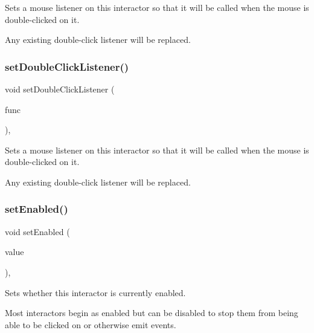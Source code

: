 Sets a mouse listener on this interactor so that it will be called when the mouse is double-\/clicked on it. 

Any existing double-\/click listener will be replaced. \mbox{\label{classGInteractor_a50096194d66f48c92dd4c512d41bfc76}} 
\subsubsection{\texorpdfstring{set\+Double\+Click\+Listener()}{setDoubleClickListener()}\hspace{0.1cm}{\footnotesize\ttfamily [2/2]}}
{\footnotesize\ttfamily void set\+Double\+Click\+Listener (\begin{DoxyParamCaption}\item[{G\+Event\+Listener\+Void}]{func }\end{DoxyParamCaption})\hspace{0.3cm}{\ttfamily [virtual]}, {\ttfamily [inherited]}}



Sets a mouse listener on this interactor so that it will be called when the mouse is double-\/clicked on it. 

Any existing double-\/click listener will be replaced. \mbox{\label{classGInteractor_ab831367dd84bbd579e02e55bacb21343}} 
\subsubsection{\texorpdfstring{set\+Enabled()}{setEnabled()}}
{\footnotesize\ttfamily void set\+Enabled (\begin{DoxyParamCaption}\item[{bool}]{value }\end{DoxyParamCaption})\hspace{0.3cm}{\ttfamily [virtual]}, {\ttfamily [inherited]}}



Sets whether this interactor is currently enabled. 

Most interactors begin as enabled but can be disabled to stop them from being able to be clicked on or otherwise emit events. \mbox{\label{classGObservable_ad2f6d34961c50f6c1e0659990b79f741}} 
